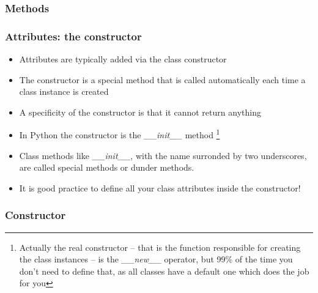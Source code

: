 \documentclass[9pt]{beamer}
\begin{document}
\begin{frame}
  \frametitle{Methods}
  
\end{frame}


%  


%  


\begin{frame}
  \frametitle{Attributes: the constructor}

  \begin{itemize}
    \small
    \item Attributes are typically added via the class \alert{constructor}
    \medskip
    \item The constructor is a special method that is called automatically each time
          a class instance is created
    \medskip
    \item A specificity of the constructor is that it cannot return anything
    \medskip
    \item In Python the constructor is the \emph{\_\_init\_\_} method%
          \footnote{Actually the real constructor -- that is the function responsible for
                    creating the class instances -- is the \emph{\_\_new\_\_} operator, but 99\% of the time you don't need
                    to define that, as all classes have a default one which does the job for you}
    \medskip
    \item Class methods like \emph{\_\_init\_\_}, with the name surronded by two underscores,
          are called \alert{special} methods or \alert{dunder} methods.
    \medskip
    \item It is good practice to define all your class attributes inside the constructor!

  \end{itemize}

\end{frame}


\begin{frame}
  \frametitle{Constructor}
  
\end{frame}
\end{document}
